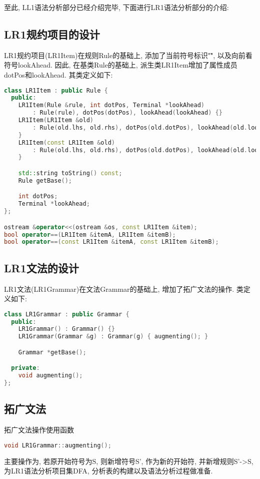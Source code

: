 至此, LL1语法分析部分已经介绍完毕, 下面进行LR1语法分析部分的介绍:

\subsection{LR1规约项目的设计}
LR1规约项目(LR1Item)在规则Rule的基础上, 添加了当前符号标识"\~",
以及向前看符号lookAhead. 因此, 在基类Rule的基础上,
派生类LR1Item增加了属性成员dotPos和lookAhead.  其类定义如下:
\begin{lstlisting}[language=c++]
class LR1Item : public Rule {
  public:
    LR1Item(Rule &rule, int dotPos, Terminal *lookAhead)
        : Rule(rule), dotPos(dotPos), lookAhead(lookAhead) {}
    LR1Item(LR1Item &old)
        : Rule(old.lhs, old.rhs), dotPos(old.dotPos), lookAhead(old.lookAhead) {
    }
    LR1Item(const LR1Item &old)
        : Rule(old.lhs, old.rhs), dotPos(old.dotPos), lookAhead(old.lookAhead) {
    }

    std::string toString() const;
    Rule getBase();

    int dotPos;
    Terminal *lookAhead;
};

ostream &operator<<(ostream &os, const LR1Item &item);
bool operator==(LR1Item &itemA, LR1Item &itemB);
bool operator==(const LR1Item &itemA, const LR1Item &itemB);
\end{lstlisting}

\subsection{LR1文法的设计}
LR1文法(LR1Grammar)在文法Grammar的基础上, 增加了拓广文法的操作. 类定义如下:
\begin{lstlisting}[language=c++]
class LR1Grammar : public Grammar {
  public:
    LR1Grammar() : Grammar() {}
    LR1Grammar(Grammar &g) : Grammar(g) { augmenting(); }

    Grammar *getBase();

  private:
    void augmenting();
};
\end{lstlisting}

\subsection{拓广文法}
拓广文法操作使用函数
\begin{lstlisting}[language=c++]
void LR1Grammar::augmenting();
\end{lstlisting}
主要操作为, 若原开始符号为S, 则新增符号S', 作为新的开始符, 并新增规则S'->S,
为LR1语法分析项目集DFA, 分析表的构建以及语法分析过程做准备.

